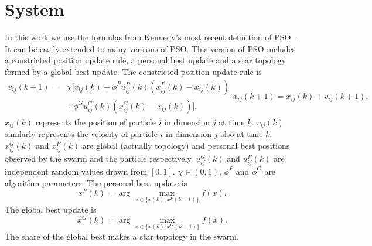 \section{System}
\label{sec:system}

In this work we use the formulas from Kennedy's most recent definition of PSO~\cite{4223164}.
It can be easily extended to many versions of PSO.
This version of PSO includes a constricted position update rule, a personal best update and a star topology formed by a global best update.
The constricted position update rule is
\begin{subequations}
\label{eq:pso_alg}
\begin{equation}
\label{eq:up_vel}
\begin{aligned}
v_{ij}(k+1) = &  \chi [ v_{ij}(k) 
 + \phi^{P} u^{P}_{ij}(k) (x^{P}_{ij}(k) - x_{ij}(k))\\
 & + \phi^{G} u^{G}_{ij}(k) ( x^{G}_{ij}(k) - x_{ij}(k)) ],
\end{aligned}
\end{equation}
\begin{equation}
\label{eq:up_pos}
x_{ij}(k+1) = x_{ij}(k) + v_{ij}(k+1).
\end{equation}
\end{subequations}
$ x_{ij}(k) $ represents the position of particle $ i $ in dimension $ j $ at time $ k $.
$ v_{ij}(k) $ similarly represents the velocity of particle $ i $ in dimension $ j $ also at time $ k $.
$ x^{G}_{ij}(k) $ and $ x^{P}_{ij}(k) $ are global (actually topology) and personal best positions observed by the swarm and the particle respectively. 
$ u^{G}_{ij}(k) $ and $ u^{P}_{ij}(k) $ are independent random values drawn from $ [0,1] $.
$ \chi \in ( 0, 1 ) $, $ \phi^{P} $ and $ \phi^{G} $ are algorithm parameters.
The personal best update is
\begin{equation}
\label{eq:pb_up}
x^{P}(k) = \arg \max_{ x \in \{ x(k), x^{P}(k-1) \} } f(x).
\end{equation}
The global best update is
\begin{equation}
\label{eq:gb_up}
x^{G}(k) = \arg \max_{ x \in \{ x(k), x^{G}(k-1) \} } f(x).
\end{equation}
The share of the global best makes a star topology in the swarm.


